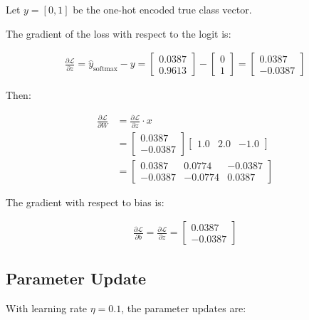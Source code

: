 Let $y = [0, 1]$ be the one-hot encoded true class vector.

The gradient of the loss with respect to the logit is:

\begin{align}
	\frac{\partial \mathcal{L}}{\partial z} = \hat{y}_{\text{softmax}} - y
	= \begin{bmatrix} 0.0387 \\ 0.9613 \end{bmatrix} - \begin{bmatrix} 0 \\ 1 \end{bmatrix}
	= \begin{bmatrix} 0.0387 \\ -0.0387 \end{bmatrix}
\end{align}

Then:

\begin{align}
	\frac{\partial \mathcal{L}}{\partial W} &= \frac{\partial \mathcal{L}}{\partial z} \cdot x \\
	&= 
	\begin{bmatrix}
		0.0387 \\
		-0.0387
	\end{bmatrix}
	\begin{bmatrix}
		1.0 & 2.0 & -1.0
	\end{bmatrix} \\
	&=
	\begin{bmatrix}
		0.0387 & 0.0774 & -0.0387 \\
		-0.0387 & -0.0774 & 0.0387
	\end{bmatrix}
\end{align}

The gradient with respect to bias is:

\begin{align}
	\frac{\partial \mathcal{L}}{\partial b} = \frac{\partial \mathcal{L}}{\partial z}
	= \begin{bmatrix} 0.0387 \\ -0.0387 \end{bmatrix}
\end{align}


\subsection*{Parameter Update}

With learning rate $\eta = 0.1$, the parameter updates are:

